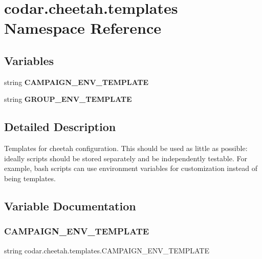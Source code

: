 \hypertarget{namespacecodar_1_1cheetah_1_1templates}{}\section{codar.\+cheetah.\+templates Namespace Reference}
\label{namespacecodar_1_1cheetah_1_1templates}
\subsection*{Variables}
\begin{DoxyCompactItemize}
\item 
string {\bfseries C\+A\+M\+P\+A\+I\+G\+N\+\_\+\+E\+N\+V\+\_\+\+T\+E\+M\+P\+L\+A\+TE}
\item 
string {\bfseries G\+R\+O\+U\+P\+\_\+\+E\+N\+V\+\_\+\+T\+E\+M\+P\+L\+A\+TE}
\end{DoxyCompactItemize}


\subsection{Detailed Description}
\begin{DoxyVerb}Templates for cheetah configuration. This should be used as little as possible:
ideally scripts should be stored separately and be independently testable.
For example, bash scripts can use environment variables for customization
instead of being templates.
\end{DoxyVerb}
 

\subsection{Variable Documentation}
\mbox{\label{namespacecodar_1_1cheetah_1_1templates_a95cd1c28dbb2f235ef6be369f57e36f8}} 
\subsubsection{\texorpdfstring{C\+A\+M\+P\+A\+I\+G\+N\+\_\+\+E\+N\+V\+\_\+\+T\+E\+M\+P\+L\+A\+TE}{CAMPAIGN\_ENV\_TEMPLATE}}
{\footnotesize\ttfamily string codar.\+cheetah.\+templates.\+C\+A\+M\+P\+A\+I\+G\+N\+\_\+\+E\+N\+V\+\_\+\+T\+E\+M\+P\+L\+A\+TE}

